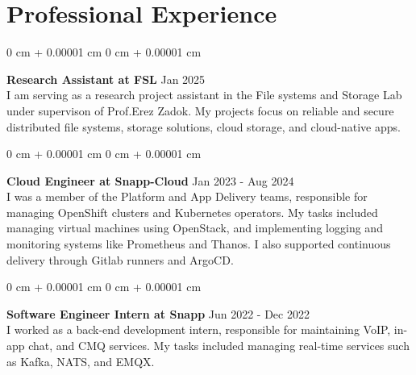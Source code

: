 \documentclass[10pt, letterpaper]{article}
\newenvironment{onecolentry}{
    \begin{adjustwidth}{
        0 cm + 0.00001 cm
    }{
        0 cm + 0.00001 cm
    }
}{
    \end{adjustwidth}
} %
\begin{document}
    \section{Professional Experience}
        \begin{onecolentry}
            \textbf{Research Assistant at FSL} \hfill Jan 2025\\
            \noindent\justifying
            I am serving as a research project assistant in the File systems and Storage Lab under supervison of Prof.Erez Zadok. My projects focus on reliable and secure distributed file systems, storage solutions, cloud storage, and cloud-native apps.
        \end{onecolentry}
        \vspace{0.15 cm}
        \begin{onecolentry}
            \textbf{Cloud Engineer at Snapp-Cloud} \hfill Jan 2023 - Aug 2024\\
            \noindent\justifying
            I was a member of the Platform and App Delivery teams, responsible for managing OpenShift clusters and Kubernetes operators. My tasks included managing virtual machines using OpenStack, and implementing logging and monitoring systems like Prometheus and Thanos. I also supported continuous delivery through Gitlab runners and ArgoCD.
        \end{onecolentry}
        \vspace{0.15 cm}
        \begin{onecolentry}
            \textbf{Software Engineer Intern at Snapp} \hfill Jun 2022 - Dec 2022\\
            \noindent\justifying
            I worked as a back-end development intern, responsible for maintaining VoIP, in-app chat, and CMQ services. My tasks included managing real-time services such as Kafka, NATS, and EMQX.
        \end{onecolentry}
\end{document}
